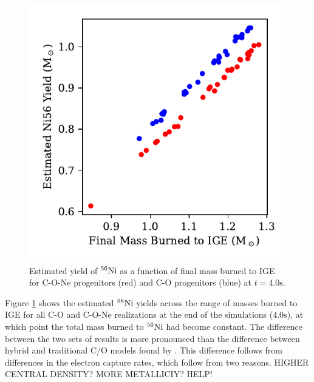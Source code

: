 \documentclass[iop,apj]{emulateapj}
\newcommand{\Ni}[1]{\ensuremath{{}^{#1}{\rm Ni}}}
\newcommand{\unitstyle}[1]{\ensuremath{\mathrm{#1}}}
\newcommand{\second}{\unitstyle{s}}
\begin{document}
\begin{figure}
\includegraphics[width=\columnwidth]{figures/FMBTI_v_Ni56Yield_plot.pdf}
\caption{\label{fig:conversion}
Estimated yield of \Ni{56} as a function of final mass burned to IGE
for C-O-Ne progenitors (red) and C-O progenitors (blue) at
$t = 4.0 \second$.
}
\end{figure}
Figure \ref{fig:conversion} shows the estimated \Ni{56} yields
across the range of masses burned to IGE
for all C-O and C-O-Ne realizations at the end
of the simulations ($4.0 \second$),
at which point the total mass burned to \Ni{56} had become constant.
The difference between the two sets of results is more pronounced
than the difference between hybrid and traditional C/O models
found by \citet{willcoxetal2016}. This difference follows from
differences in the electron capture rates, which follow from
{\color{red} two} reasons. {\color{red} HIGHER CENTRAL DENSITY?
MORE METALLICIY? HELP!}
\end{document}
